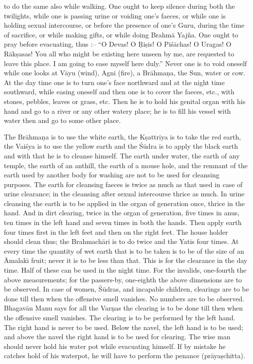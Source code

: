 to do the same also while walking. One ought to keep silence during both the twilights, while one is passing urine or voiding one's faeces, or while one is holding sexual intercourse, or before the presence of one's Guru, during the time of sacrifice, or while making gifts, or while doing Brahm\=a Yaj\~na. One ought to pray before evacuating, thus :-- ``O Devas! O \d{R}i\d{s}is! O Pi\'s\=achas! O Uragas! O R\=ak\d{s}asas! You all who might be existing here unseen by me, are requested to leave this place. I am going to ease myself here duly.'' Never one is to void oneself while one looks at V\=ayu (wind), Agni (fire), a Br\=ahma\d{n}a, the Sun, water or cow. At the day time one is to turn one's face northward and at the night time southward, while easing oneself and then one is to cover the faeces, etc., with stones, pebbles, leaves or grass, etc. Then he is to hold his genital organ with his hand and go to a river or any other watery place; he is to fill his vessel with water then and go to some other place.

The Br\=ahma\d{n}a is to use the white earth, the K\d{s}attriya is to take the red earth, the Vai\'sya is to use the yellow earth and the \'S\=udra is to apply the black earth and with that he is to cleanse himself. The earth under water, the earth of any temple, the earth of an anthill, the earth of a mouse hole, and the remnant of the earth used by another body for washing are not to be used for cleansing purposes. The earth for cleansing faeces is twice as much as that used in case of urine clearance; in the cleansing after sexual intercourse thrice as much. In urine cleansing the earth is to be applied in the organ of generation once, thrice in the hand. And in dirt clearing, twice in the organ of generation, five times in anus, ten times in the left hand and seven times in both the hands. Then apply earth four times first in the left feet and then on the right feet. The house holder should clean thus; the Brahmach\=ari is to do twice and the Yatis four times. At every time the quantity of wet earth that is to be taken is to be of the size of an \=Amalak\={\i} fruit; never it is to be less than that. This is for the clearance in the day time. Half of these can be used in the night time. For the invalids, one-fourth the above measurements; for the passers-by, one-eighth the above dimensions are to be observed. In case of women, \'S\=udras, and incapable children, clearings are to be done till then when the offensive smell vanishes. No numbers are to be observed. Bhagav\=an Manu says for all the Var\d{n}as the clearing is to be done till then when the offensive smell vanishes. The clearing is to be performed by the left hand. The right hand is never to be used. Below the navel, the left hand is to be used; and above the navel the right hand is to be used for clearing. The wise man should never hold his water pot while evacuating himself. If by mistake he catches hold of his waterpot, he will have to perform the penance (pr\=aya\d{s}chitta).

